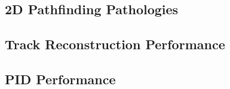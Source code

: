 \subsection{2D Pathfinding Pathologies}
\subsection{Track Reconstruction Performance}
\subsection{PID Performance}